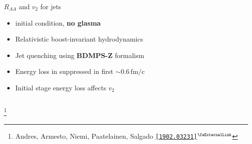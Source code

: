 \documentclass[aspectratio=169,11pt,usenames,dvipsnames]{beamer}
\renewcommand{\thefootnote}{\color{customblue}\faPaperPlaneO}
\newcommand\blfootnote[1]{%
  \begingroup
  \renewcommand\thefootnote{}\footnote{#1}%
  \addtocounter{footnote}{-1}%
  \endgroup
}
\begin{document}
\begin{frame}[t,noframenumbering]
\begin{columns}[onlytextwidth,t]
        \begin{center}
            {\Large\color{palteal} $R_{AA}$ and $v_2$ for jets \\[10pt]}
            \footnotesize
                \begin{itemize}
                    \item {\color{lightgray}{\bfseries EKRT} initial condition, {\bfseries no glasma}}
                    \item {\color{lightgray}Relativistic boost-invariant hydrodynamics}
                    \item {\color{lightgray}Jet quenching using {\bfseries BDMPS-Z} formalism}
                    \item {\color{lightgray}Energy loss in suppressed in first $\sim 0.6\,\mathrm{fm/c}$}
                    \item {\color{lightgray}Initial stage energy loss affects $v_2$}
                \end{itemize}
        \end{center}
    \end{columns}
    \blfootnote{\scriptsize Andres, Armesto, Niemi, Paatelainen, Salgado \href{https://arxiv.org/abs/1902.03231}{\color{palgold}\texttt{[1902.03231]}$^\text{\scalebox{0.9}{\faExternalLink}}$}}
\end{frame}


\end{document}
